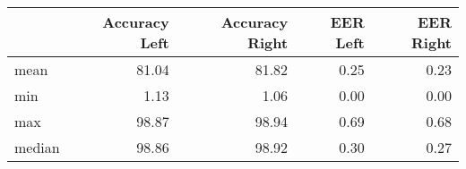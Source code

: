 \begin{tabular}{lrrrr}
\toprule
{} &  Accuracy Left &  Accuracy Right &  EER Left &  EER Right \\
\midrule
mean   &          81.04 &           81.82 &      0.25 &       0.23 \\
min    &           1.13 &            1.06 &      0.00 &       0.00 \\
max    &          98.87 &           98.94 &      0.69 &       0.68 \\
median &          98.86 &           98.92 &      0.30 &       0.27 \\
\bottomrule
\end{tabular}
